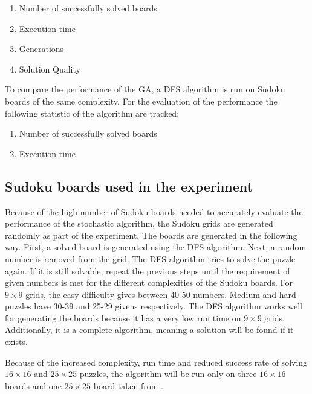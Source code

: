 \begin{enumerate}
	\item Number of successfully solved boards
	\item Execution time
	\item Generations
	\item Solution Quality
\end{enumerate}

To compare the performance of the GA, a DFS algorithm is run on Sudoku boards of the same complexity. For the evaluation of the performance the following statistic of the algorithm are tracked:
\begin{enumerate}
	\item Number of successfully solved boards
	\item Execution time
\end{enumerate}

\subsection{Sudoku boards used in the experiment}
Because of the high number of Sudoku boards needed to accurately evaluate the performance of the stochastic algorithm, the Sudoku grids are generated randomly as part of the experiment. The boards are generated in the following way. 
First, a solved board is generated using the DFS algorithm. Next, a random number is removed from the grid. The DFS algorithm tries to solve the puzzle again. If it is still solvable, repeat the previous steps until the requirement of given numbers is met for the different complexities of the Sudoku boards. For $9 \times 9$ grids, the easy difficulty gives between 40-50 numbers. Medium and hard puzzles have 30-39 and 25-29 givens respectively. The DFS algorithm works well for generating the boards because it has a very low run time on $9 \times 9$ grids. Additionally, it is a complete algorithm, meaning a solution will be found if it exists.

Because of the increased complexity, run time and reduced success rate of solving $16 \times 16$ and $25 \times 25$ puzzles, the algorithm will be run only on three $16 \times 16$ boards and one $25 \times 25$ board taken from \cite{Sudoku16,Sudoku25}.